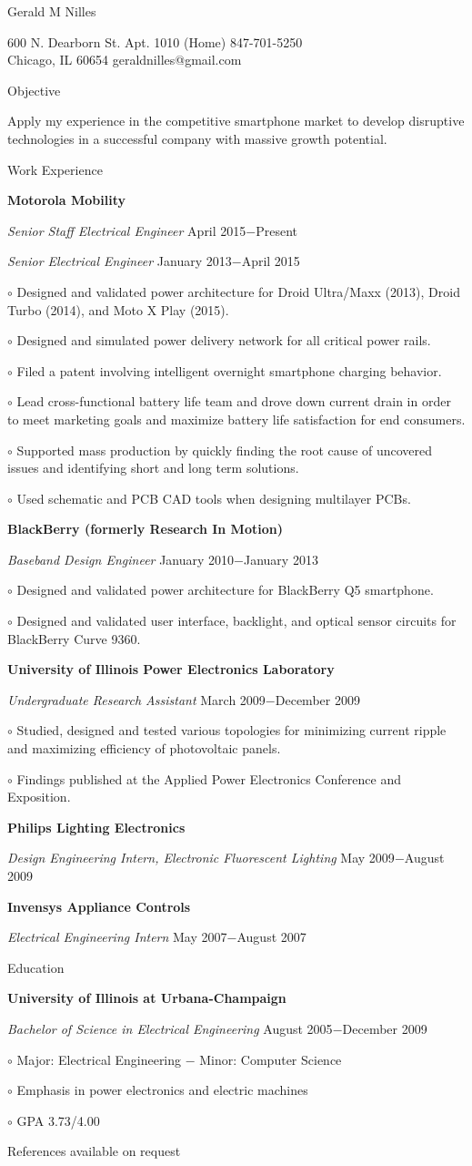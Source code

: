 \documentclass[12pt, letterpaper]{article}
\newcommand{\myname}[1]{{\begin{center} \LARGE #1 \end{center} \par }}
\newcommand{\myhead}[1]{{\vspace{2mm} \Large #1 \par}}
\newcommand{\objective}[1]{{\addtolength{\leftskip}{10mm} #1 \par }}
\newcommand{\company}[1]{{\vspace{1mm} \addtolength{\leftskip}{10mm} \textbf{#1} \par}}
\newcommand{\position}[2]{{\addtolength{\leftskip}{10mm} \emph{#1} \hfill #2 \par \vspace{1mm}}}
\newcommand{\skill}[1]{{  \vspace{0.3mm} \addtolength{\leftskip}{20mm} \setlength\parindent{-4mm} $\circ$ #1 \par}}
\begin{document}
\pagestyle{empty}
\raggedright

\myname{Gerald M Nilles}
600 N. Dearborn St. Apt. 1010 \hfill (Home) 847-701-5250 \\
Chicago, IL 60654   \hfill geraldnilles@gmail.com \\
\myhead{Objective}
    \objective{Apply my experience in the competitive smartphone market to develop disruptive technologies in a successful company with massive growth potential.}

\myhead{Work Experience}
    \company{Motorola Mobility}
    \position{Senior Staff Electrical Engineer}{April 2015$-$Present}
    \position{Senior Electrical Engineer}{January 2013$-$April 2015}
        \skill{Designed and validated power architecture for Droid Ultra/Maxx (2013), Droid Turbo (2014), and Moto X Play (2015).}
        \skill{Designed and simulated power delivery network for all critical power rails.}
	\skill{Filed a patent involving intelligent overnight smartphone charging behavior.}
        \skill{Lead cross-functional battery life team and drove down current drain in order to meet marketing goals and maximize battery life satisfaction for end consumers.}
	\skill{Supported mass production by quickly finding the root cause of uncovered issues and identifying short and long term solutions.}
        \skill{Used schematic and PCB CAD tools when designing multilayer PCBs.}

    \company{BlackBerry (formerly Research In Motion)}
    \position{Baseband Design Engineer}{January 2010$-$January 2013}
        \skill{Designed and validated power architecture for BlackBerry Q5 smartphone.}
        \skill{Designed and validated user interface, backlight, and optical sensor circuits for BlackBerry Curve 9360.}

    \company{University of Illinois Power Electronics Laboratory}
    \position{Undergraduate Research Assistant}{March 2009$-$December 2009}
        \skill{Studied, designed and tested various topologies for minimizing current ripple and maximizing efficiency of photovoltaic panels.}
	\skill{Findings published at the Applied Power Electronics Conference and Exposition.}

    \company{Philips Lighting Electronics} 
    \position{Design Engineering Intern, Electronic Fluorescent Lighting}{May 2009$-$August 2009}

    \company{Invensys Appliance Controls}
    \position{Electrical Engineering Intern}{May 2007$-$August 2007}

\myhead{Education}
    \company{University of Illinois at Urbana-Champaign}
    \position{Bachelor of Science in Electrical Engineering}{August 2005$-$December 2009}
        \skill{Major: Electrical Engineering $-$ Minor: Computer Science}
        \skill{Emphasis in power electronics and electric machines}
	\skill{GPA 3.73/4.00}

\begin{center}
\small
References available on request
\end{center}
\end{document}
